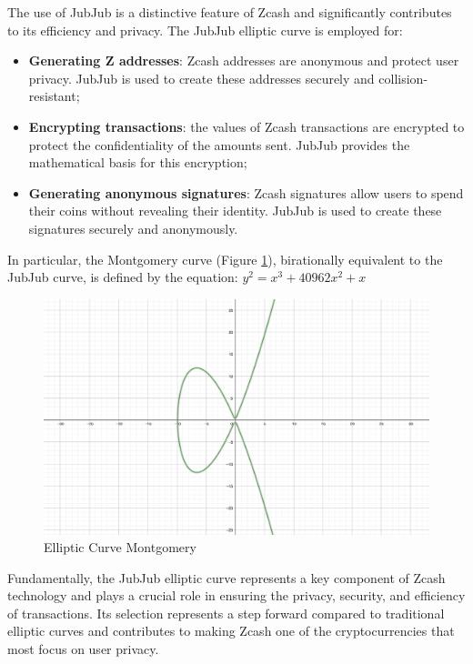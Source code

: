 \noindent The use of JubJub is a distinctive feature of Zcash and significantly contributes to its efficiency and privacy. The JubJub elliptic curve is employed for:

\begin{itemize}
    \item \textbf{Generating Z addresses}: Zcash addresses are anonymous and protect user privacy. JubJub is used to create these addresses securely and collision-resistant;
    \item \textbf{Encrypting transactions}: the values of Zcash transactions are encrypted to protect the confidentiality of the amounts sent. JubJub provides the mathematical basis for this encryption;
    \item \textbf{Generating anonymous signatures}: Zcash signatures allow users to spend their coins without revealing their identity. JubJub is used to create these signatures securely and anonymously.
\end{itemize}

\noindent In particular, the Montgomery curve (Figure \ref{fig:jubjub}), birationally equivalent to the JubJub curve, is defined by the equation:
\(y^2 = x^3 + 40962x^2 + x\)

\begin{figure}[!ht]
    \centering
    \includegraphics[width=1\linewidth]{img/jubjub.png}
    \caption{Elliptic Curve Montgomery}
    \label{fig:jubjub}
\end{figure}

\noindent Fundamentally, the JubJub elliptic curve represents a key component of Zcash technology and plays a crucial role in ensuring the privacy, security, and efficiency of transactions. Its selection represents a step forward compared to traditional elliptic curves and contributes to making Zcash one of the cryptocurrencies that most focus on user privacy.